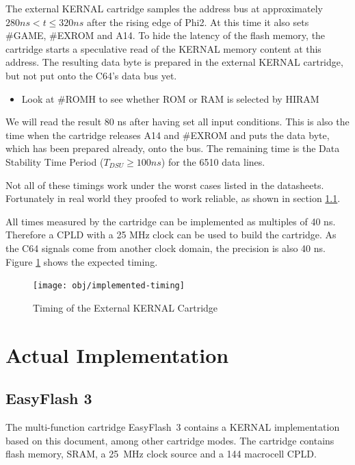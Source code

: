 \documentclass[a4paper,oneside]{memoir}
\begin{document}
The external KERNAL cartridge samples the address bus at approximately $280 ns < t \le 320 ns$ after the rising edge of Phi2.
At this time it also sets \#GAME, \#EXROM and A14.
To hide the latency of the flash memory, the cartridge starts a speculative read of the KERNAL memory content at this address.
The resulting data byte is prepared in the external KERNAL cartridge, but not put onto the C64's data bus yet.

\begin{itemize}
\item Look at \#ROMH to see whether ROM or RAM is selected by HIRAM
\end{itemize}

We will read the result 80 ns after having set all input conditions.
This is also the time when the cartridge releases A14 and \#EXROM and puts the data byte, which has been prepared already, onto the bus.
The remaining time is the Data Stability Time Period ($T_{DSU} \ge 100 ns$) for the 6510 data lines. 

Not all of these timings work under the worst cases listed in the datasheets.
Fortunately in real world they proofed to work reliable, as shown in section \ref{sec:ef3}.

All times measured by the cartridge can be implemented as multiples of 40 ns.
Therefore a CPLD with a 25 MHz clock can be used to build the cartridge.
As the C64 signals come from another clock domain, the precision is also 40 ns.
Figure \ref {fig:timing} shows the expected timing.

\begin{figure}
    \centering
    \texttt{[image: obj/implemented-timing]}
    \caption{Timing of the External KERNAL Cartridge}
    \label{fig:timing}
\end{figure}

\chapter{Actual Implementation}

\section{EasyFlash 3}

\label{sec:ef3} The multi-function cartridge EasyFlash~3 contains a KERNAL implementation based on this document, among other cartridge modes.
The cartridge contains flash memory, SRAM, a 25~MHz clock source and a 144 macrocell CPLD.
\end{document}
